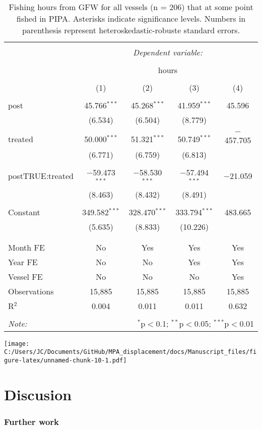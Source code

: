 \documentclass[]{article}
\theoremstyle{definition}
\theoremstyle{definition}
\theoremstyle{definition}
\theoremstyle{remark}
\begin{document}
\begin{table}[!htbp] \centering 
  \caption{\label{tab:all_vessels}Fishing hours from GFW for all vessels (n = 206) that at some point fished in PIPA. Asterisks indicate significance levels. Numbers in parenthesis represent heteroskedastic-robuste standard errors.} 
  \label{} 
\begin{tabular}{@{\extracolsep{5pt}}lcccc} 
\\[-1.8ex]\hline 
\hline \\[-1.8ex] 
 & \multicolumn{4}{c}{\textit{Dependent variable:}} \\ 
\cline{2-5} 
\\[-1.8ex] & \multicolumn{4}{c}{hours} \\ 
\\[-1.8ex] & (1) & (2) & (3) & (4)\\ 
\hline \\[-1.8ex] 
 post & 45.766$^{***}$ & 45.268$^{***}$ & 41.959$^{***}$ & 45.596 \\ 
  & (6.534) & (6.504) & (8.779) &  \\ 
  & & & & \\ 
 treated & 50.000$^{***}$ & 51.321$^{***}$ & 50.749$^{***}$ & $-$457.705 \\ 
  & (6.771) & (6.759) & (6.813) &  \\ 
  & & & & \\ 
 postTRUE:treated & $-$59.473$^{***}$ & $-$58.530$^{***}$ & $-$57.494$^{***}$ & $-$21.059 \\ 
  & (8.463) & (8.432) & (8.491) &  \\ 
  & & & & \\ 
 Constant & 349.582$^{***}$ & 328.470$^{***}$ & 333.794$^{***}$ & 483.665 \\ 
  & (5.635) & (8.833) & (10.226) &  \\ 
  & & & & \\ 
\hline \\[-1.8ex] 
Month FE & No & Yes & Yes & Yes \\ 
Year FE & No & No & Yes & Yes \\ 
Vessel FE & No & No & No & Yes \\ 
Observations & 15,885 & 15,885 & 15,885 & 15,885 \\ 
R$^{2}$ & 0.004 & 0.011 & 0.011 & 0.632 \\ 
\hline 
\hline \\[-1.8ex] 
\textit{Note:}  & \multicolumn{4}{r}{$^{*}$p$<$0.1; $^{**}$p$<$0.05; $^{***}$p$<$0.01} \\ 
\end{tabular} 
\end{table}

\texttt{[image: C:/Users/JC/Documents/GitHub/MPA\_displacement/docs/Manuscript\_files/figure-latex/unnamed-chunk-10-1.pdf]}

\section{Discusion}\label{discusion}

\clearpage

\subsubsection{Further work}\label{further-work}

\renewcommand\refname{References}

\end{document}
